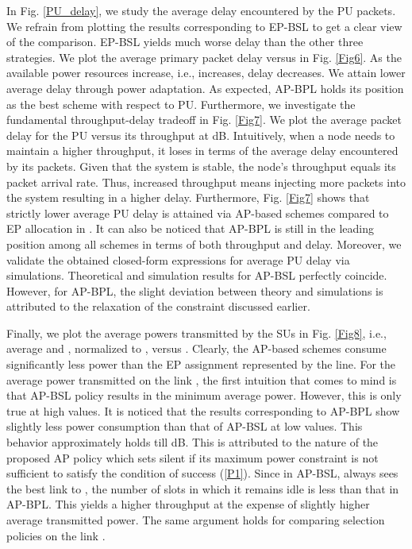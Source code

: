 \documentclass[journal,twocolumn]{IEEEtran}
\begin{document}
In Fig. \ref{PU_delay}, we study the average delay encountered by the PU packets. We refrain from plotting the results corresponding to EP-BSL to get a clear view of the comparison. EP-BSL yields much worse delay than the other three strategies. We plot the average primary packet delay versus  in Fig. \ref{Fig6}. As the available power resources increase, i.e.,  increases, delay decreases. We attain lower average delay through power adaptation. As expected, AP-BPL holds its position as the best scheme with respect to PU. Furthermore, we investigate the fundamental throughput-delay tradeoff in Fig. \ref{Fig7}. We plot the average packet delay for the PU versus its throughput at  dB. Intuitively, when a node needs to maintain a higher throughput, it loses in terms of the average delay encountered by its packets. Given that the system is stable, the node's throughput equals its packet arrival rate. Thus, increased throughput means injecting more packets into the system resulting in a higher delay. Furthermore, Fig. \ref{Fig7} shows that strictly lower average PU delay is attained via AP-based schemes compared to EP allocation in \cite{Krikidis}. It can also be noticed that AP-BPL is still in the leading position among all schemes in terms of both throughput and delay. Moreover, we validate the obtained closed-form expressions for average PU delay via simulations. Theoretical and simulation results for AP-BSL perfectly coincide. However, for AP-BPL, the slight deviation between theory and simulations is attributed to the relaxation of the constraint  discussed earlier.

Finally, we plot the average powers transmitted by the SUs in Fig. \ref{Fig8}, i.e., average  and , normalized to , versus . Clearly, the AP-based schemes consume significantly less power than the EP assignment represented by the  line. For
the average power transmitted on the link , the first intuition that comes to mind is that AP-BSL policy results in the minimum average power. However, this is only true at high  values. It is noticed that the results corresponding to AP-BPL show
slightly less power consumption than that of AP-BSL at low  values. This behavior approximately holds till  dB. This is attributed to the nature of the proposed AP policy which sets  silent if its maximum power constraint is not sufficient to satisfy the condition of success (\ref{P1}). Since in AP-BSL,  always sees the best link to , the number of slots in which it remains idle is less than that in AP-BPL. This yields a higher throughput at the expense of slightly higher average transmitted power. The same argument holds for comparing selection policies on the link .
\end{document}
